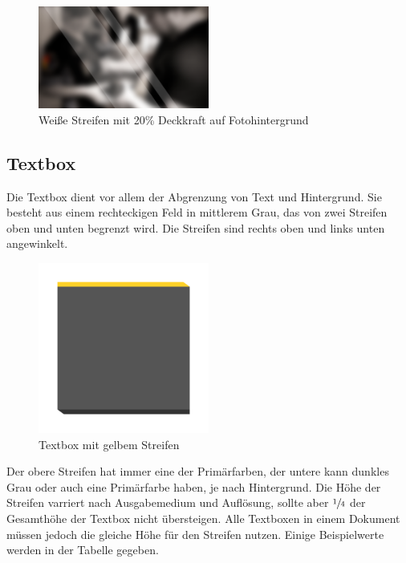 \documentclass{article}
\begin{document}
\begin{figure}[H]
\begin{center}
\includegraphics[width=0.5\textwidth]{Docs/streifen_foto.png}
\end{center}
\caption{Weiße Streifen mit 20\% Deckkraft auf Fotohintergrund}
\end{figure}

\subsection{Textbox}
Die Textbox dient vor allem der Abgrenzung von Text und Hintergrund.
Sie besteht aus einem rechteckigen Feld in mittlerem Grau, das von zwei Streifen oben und unten begrenzt wird.
Die Streifen sind rechts oben und links unten angewinkelt.

\begin{figure}[H]
\begin{center}
\includegraphics[width=0.5\textwidth]{Docs/textbox.png}
\end{center}
\caption{Textbox mit gelbem Streifen}
\end{figure}

Der obere Streifen hat immer eine der Primärfarben, der untere kann dunkles Grau oder auch eine Primärfarbe haben, je nach Hintergrund.
Die Höhe der Streifen varriert nach Ausgabemedium und Auflösung, sollte aber $\sfrac{1}{4}$ der Gesamthöhe der Textbox nicht übersteigen.
Alle Textboxen in einem Dokument müssen jedoch die gleiche Höhe für den Streifen nutzen.
Einige Beispielwerte werden in der Tabelle gegeben.
\end{document}
